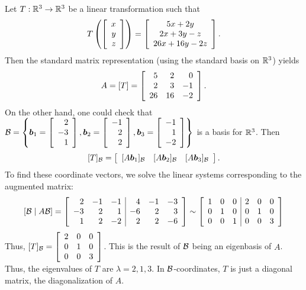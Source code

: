 \begin{Exam} Let $T : \R^3\to \R^3$ be a linear transformation such that %
\[T\left(\vr{x\\y\\z}\right) = \mtx{c}{5x+2y\\2x+3y-z\\26x+16y-2z}.\] Then the standard matrix representation (using the standard basis on $\R^3$) yields
\[A= [T] = \mtx{rrr}{5&2&0\\2&3&-1\\26&16&-2}.\] On the other hand, one could check that $\B = \left\{\bb b_1 = \vr{2\\-3\\1}, \bb b_2 = \vr{-1\\2\\2}, \bb b_3 = \vr{-1\\1\\-2}\right\}$ is a basis for $\R^3$. Then 
\[[T]_\B = \mtx{ccc}{ [A\bb b_1]_\B & [A\bb b_2]_\B & [A\bb b_3]_\B}.\] To find these coordinate vectors, we solve the linear systems corresponding to the augmented matrix:
\[[\B \mid A\B] = \mtx{rrr|rrr}{2&-1&-1&4&-1&-3\\-3&2&1&-6&2&3\\1&2&-2&2&2&-6} \sim \mtx{rrr|rrr}{1&0&0&2&0&0\\0&1&0&0&1&0\\0&0&1&0&0&3} \] Thus, $[T]_\B = \mtx{ccc}{2&0&0\\0&1&0\\0&0&3}$. This is the result of $\B$ being an eigenbasis of $A$. Thus, the eigenvalues of $T$ are $\lambda =2, 1, 3$. In $\B$-coordinates, $T$ is just a diagonal matrix, the diagonalization of $A$.
\end{Exam}\vs


